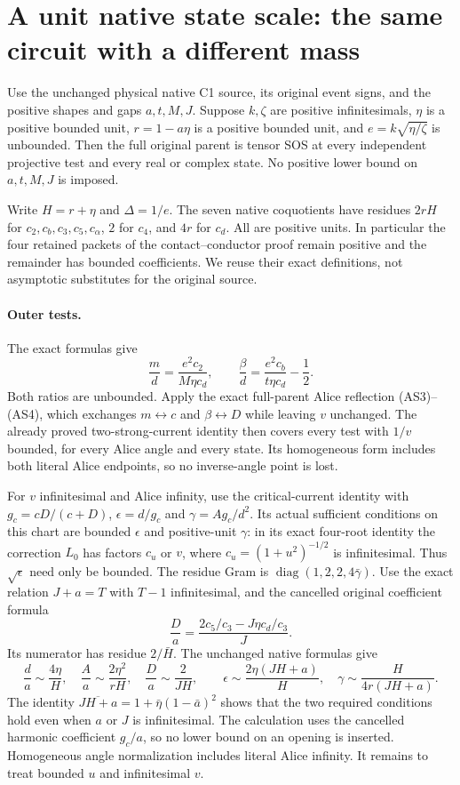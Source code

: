 \section{A unit native state scale: the same circuit with a different mass}

\begin{theorem}
Use the unchanged physical native C1 source, its original event signs,
and the positive shapes and gaps $a,t,M,J$. Suppose $k,\zeta$ are
positive infinitesimals, $\eta$ is a positive bounded unit,
$r=1-a\eta$ is a positive bounded unit, and $e=k\sqrt{\eta/\zeta}$
is unbounded. Then the full original parent is tensor SOS at every
independent projective test and every real or complex state.
No positive lower bound on $a,t,M,J$ is imposed.
\end{theorem}

Write $H=r+\eta$ and $\Delta=1/e$. The seven native coquotients
have residues $2rH$ for $c_2,c_b,c_3,c_5,c_\alpha$, $2$ for
$c_4$, and $4r$ for $c_d$. All are positive units. In particular the
four retained packets of the contact--conductor proof remain positive
and the remainder has bounded coefficients. We reuse their exact
definitions, not asymptotic substitutes for the original source.

\paragraph{Outer tests.}
The exact formulas give
\[
 \frac md=\frac{e^2c_2}{M\eta c_d},\qquad
 \frac\beta d=\frac{e^2c_b}{t\eta c_d}-\frac12.
\]
Both ratios are unbounded. Apply the exact full-parent Alice reflection
(AS3)--(AS4), which exchanges $m\leftrightarrow c$ and
$\beta\leftrightarrow D$ while leaving $v$ unchanged. The already
proved two-strong-current identity then covers every test with $1/v$
bounded, for every Alice angle and every state. Its homogeneous form
includes both literal Alice endpoints, so no inverse-angle point is lost.

For $v$ infinitesimal and Alice infinity, use the critical-current
identity with $g_c=cD/(c+D)$, $\epsilon=d/g_c$ and
$\gamma=Ag_c/d^2$. Its actual sufficient conditions on this chart
are bounded $\epsilon$ and positive-unit $\gamma$: in its exact
four-root identity the correction $L_0$ has factors $c_u$ or $v$,
where $c_u=(1+u^2)^{-1/2}$ is infinitesimal. Thus $\sqrt\epsilon$
need only be bounded. The residue Gram is
$\operatorname{diag}(1,2,2,4\bar\gamma)$.
Use the exact relation $J+a=T$ with $T-1$ infinitesimal, and the
cancelled original coefficient formula
\[
 \frac Da=\frac{2c_5/c_3-J\eta c_d/c_3}{J}.
\]
Its numerator has residue $2/\bar H$. The unchanged native formulas give
\[
 \frac d a\sim\frac{4\eta}{H},\quad
 \frac A a\sim\frac{2\eta^2}{rH},\quad
 \frac D a\sim\frac2{JH},\qquad
 \epsilon\sim\frac{2\eta(JH+a)}H,\quad
 \gamma\sim\frac{H}{4r(JH+a)}.
\]
The identity
$\overline{JH+a}=1+\bar\eta(1-\bar a)^2$ shows that the two required
conditions hold even when $a$ or $J$ is infinitesimal. The calculation
uses the cancelled harmonic coefficient $g_c/a$, so no lower bound
on an opening is inserted. Homogeneous angle normalization includes
literal Alice infinity. It remains to treat bounded $u$ and
infinitesimal $v$.

